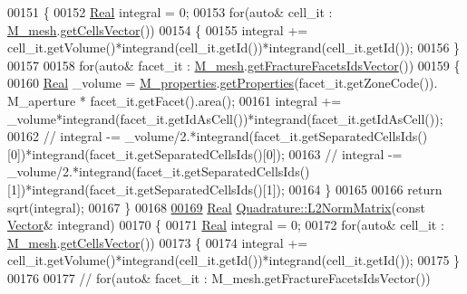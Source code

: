 \begin{DoxyCode}
00151 \{
00152     \hyperlink{namespaceFVCode3D_a40c1f5588a248569d80aa5f867080e83}{Real} integral = 0;
00153     \textcolor{keywordflow}{for}(\textcolor{keyword}{auto}& cell\_it : \hyperlink{classFVCode3D_1_1Quadrature_abaa2519ea32065df30242bd5f5cb2d01}{M\_mesh}.\hyperlink{classFVCode3D_1_1Rigid__Mesh_afefb62f2c37317402b495e2369ed495b}{getCellsVector}())
00154     \{
00155         integral += cell\_it.getVolume()*integrand(cell\_it.getId())*integrand(cell\_it.getId());
00156     \}
00157 
00158     \textcolor{keywordflow}{for}(\textcolor{keyword}{auto}& facet\_it : \hyperlink{classFVCode3D_1_1Quadrature_abaa2519ea32065df30242bd5f5cb2d01}{M\_mesh}.\hyperlink{classFVCode3D_1_1Rigid__Mesh_aadbe6d9ad704122537903396d91238e0}{getFractureFacetsIdsVector}())
00159     \{
00160         \hyperlink{namespaceFVCode3D_a40c1f5588a248569d80aa5f867080e83}{Real} \_volume = \hyperlink{classFVCode3D_1_1Quadrature_ace6cd23087209d3186ae173c265cde39}{M\_properties}.\hyperlink{classFVCode3D_1_1PropertiesMap_ace888d15c9a4ab13d5e217a3a565604c}{getProperties}(facet\_it.getZoneCode()).
      M\_aperture * facet\_it.getFacet().area();
00161         integral += \_volume*integrand(facet\_it.getIdAsCell())*integrand(facet\_it.getIdAsCell());
00162 \textcolor{comment}{//        integral -=
       \_volume/2.*integrand(facet\_it.getSeparatedCellsIds()[0])*integrand(facet\_it.getSeparatedCellsIds()[0]);}
00163 \textcolor{comment}{//        integral -=
       \_volume/2.*integrand(facet\_it.getSeparatedCellsIds()[1])*integrand(facet\_it.getSeparatedCellsIds()[1]);}
00164     \}
00165 
00166     \textcolor{keywordflow}{return} sqrt(integral);
00167 \}
00168 
\hypertarget{Quadrature_8cpp_source.tex_l00169}{}\hyperlink{classFVCode3D_1_1Quadrature_a94672e9671bb0bf9cf2e89951fd9535d}{00169} \hyperlink{namespaceFVCode3D_a40c1f5588a248569d80aa5f867080e83}{Real} \hyperlink{classFVCode3D_1_1Quadrature_a94672e9671bb0bf9cf2e89951fd9535d}{Quadrature::L2NormMatrix}(\textcolor{keyword}{const} \hyperlink{namespaceFVCode3D_a16ccf345652402bccd1a5d2e6782526c}{Vector}& integrand)
00170 \{
00171     \hyperlink{namespaceFVCode3D_a40c1f5588a248569d80aa5f867080e83}{Real} integral = 0;
00172     \textcolor{keywordflow}{for}(\textcolor{keyword}{auto}& cell\_it : \hyperlink{classFVCode3D_1_1Quadrature_abaa2519ea32065df30242bd5f5cb2d01}{M\_mesh}.\hyperlink{classFVCode3D_1_1Rigid__Mesh_afefb62f2c37317402b495e2369ed495b}{getCellsVector}())
00173     \{
00174         integral += cell\_it.getVolume()*integrand(cell\_it.getId())*integrand(cell\_it.getId());
00175     \}
00176 
00177 \textcolor{comment}{//    for(auto& facet\_it : M\_mesh.getFractureFacetsIdsVector())}

\end{DoxyCode}
